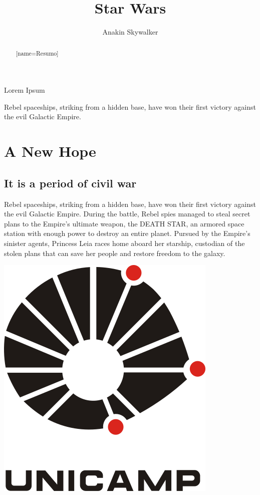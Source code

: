 \documentclass[12pt,oneside]{ifgw}
\author{Anakin Skywalker}
\institute{Instituto de Física ``Gleb Wataghin''}
\title{Star Wars}
\begin{document}
\maketitle
{}

\epigraph{Lorem Ipsum}{
Rebel spaceships, striking from a hidden base, have won their first victory against the evil Galactic Empire.}

\begin{abstract}[name=Resumo]
\lipsum[1]
\end{abstract}

\begin{abstract}
\lipsum[1]
\end{abstract}

\tableofcontents

\chapter{A New Hope}
\section{It is a period of civil war}

Rebel spaceships, striking from a hidden base, have won their first victory against the evil Galactic Empire.  During the battle, Rebel spies managed to steal secret plans to the Empire's ultimate weapon, the DEATH STAR, an armored space station with enough power to destroy an entire planet. Pursued by the Empire's sinister agents, Princess Leia races home aboard her starship, custodian of the stolen plans that can save her people and restore freedom to the galaxy.


\lipsum[1-3]


\begin{center}
\includegraphics[width=.35\textwidth]{Images/unicamp.png}
\end{center}
\end{document}
